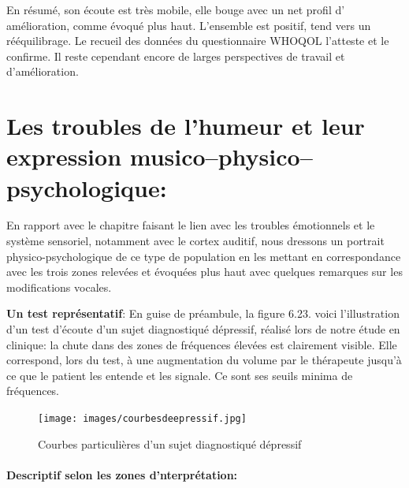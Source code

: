   En résumé, son écoute est très mobile, elle bouge avec un net profil d'
  amélioration, comme évoqué plus haut. L'ensemble est positif, tend vers un
  rééquilibrage. Le recueil des données du
  questionnaire WHOQOL l'atteste et le confirme. 
  Il reste cependant encore de larges perspectives de travail et d'amélioration.
 
  
     







 




   
  \section{Les troubles de l'humeur et leur expression
    musico--physico--psychologique:}
 En rapport  avec le chapitre faisant le lien avec les troubles
 émotionnels et le
système sensoriel, notamment avec le cortex auditif, nous
dressons un portrait
physico-psychologique de ce type de population 
  en les mettant en correspondance avec les trois zones relevées et
  évoquées plus haut avec quelques remarques sur 
  les modifications vocales.

  \textbf{Un test représentatif}: 
En guise de préambule, la figure 6.23. voici l'illustration d'un test
d'écoute d'un sujet diagnostiqué dépressif, réalisé lors de notre
étude en clinique: la
chute dans des zones de fréquences élevées est
clairement visible. Elle correspond, lors du test, à une augmentation
du volume 
par le thérapeute jusqu'à ce que le patient les entende et les signale.
Ce sont ses seuils minima de fréquences.
 \begin{figure}[ht]
	\centering
	\texttt{[image: images/courbesdeepressif.jpg]}
	\caption{Courbes particulières d'un sujet diagnostiqué dépressif}
	\label{fig:courbes du dépressif}
      \end{figure}




      \paragraph{Descriptif selon les zones d'nterprétation:}

